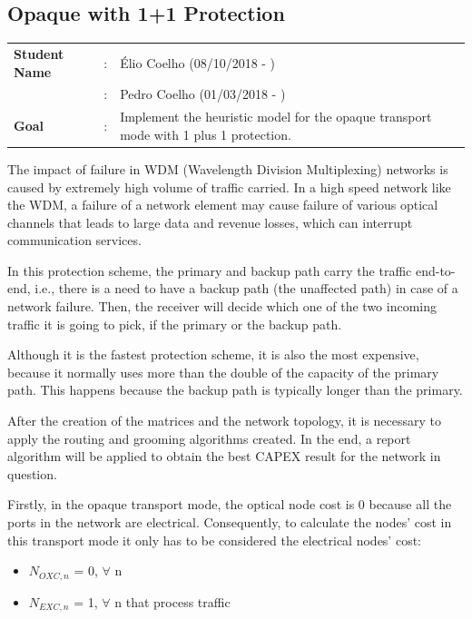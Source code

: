 \clearpage

\subsection{Opaque with 1+1 Protection}\label{heuristic_Opaque_Protection}
\begin{tcolorbox}	
\begin{tabular}{p{2.75cm} p{0.2cm} p{10.5cm}} 	
\textbf{Student Name}  &:& \'Elio Coelho    (08/10/2018 - )\\
							  &:& Pedro Coelho    (01/03/2018 - )\\
\textbf{Goal}          &:& Implement the heuristic model for the opaque transport mode with 1 plus 1 protection.
\end{tabular}
\end{tcolorbox}

\vspace{11pt}
The impact of failure in WDM (Wavelength Division Multiplexing) networks is caused by extremely high volume of traffic carried. In a high speed network like the WDM, a failure of a network element may cause failure of various optical channels that leads to large data and revenue losses, which can interrupt communication services.

In this protection scheme, the primary and backup path carry the traffic end-to-end, i.e., there is a need to have a backup path (the unaffected path) in case of a network failure. Then, the receiver will decide which one of the two incoming traffic it is going to pick, if the primary or the backup path.

Although it is the fastest protection scheme, it is also the most expensive, because it normally uses more than the double of the capacity of the primary path. This happens because the backup path is typically longer than the primary.

After the creation of the matrices and the network topology, it is necessary to apply the routing and grooming algorithms created. In the end, a report algorithm will be applied to obtain the best CAPEX result for the network in question.

Firstly, in the opaque transport mode, the optical node cost is 0 because all the ports in the network are electrical. Consequently, to calculate the nodes' cost in this transport mode it only has to be considered the electrical nodes' cost:

\begin{itemize}
  \item $N_{OXC,n}$ = 0, \quad $\forall$ n
  \item $N_{EXC,n}$ = 1, \quad $\forall$ n that process traffic
\end{itemize}

